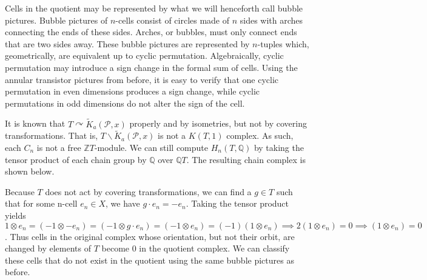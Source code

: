 \documentclass{amsart}
\newcommand{\bq}{\ensuremath{\mathbb{Q}}} %
\begin{document}
Cells in the quotient may be represented by what we will henceforth call bubble pictures. Bubble pictures of $n$-cells consist of circles made of $n$ sides with arches connecting the ends of these sides. Arches, or bubbles, must only connect ends that are two sides away. These bubble pictures are represented by $n$-tuples which, geometrically, are equivalent up to cyclic permutation. Algebraically, cyclic permutation may introduce a sign change in the formal sum of cells. Using the annular transistor pictures from before, it is easy to verify that one cyclic permutation in even dimensions produces a sign change, while cyclic permutations in odd dimensions do not alter the sign of the cell.

It is known that $T \curvearrowright \widetilde{K}_{a}(\mathcal{P}, x)$ properly and by isometries, but not by covering transformations. That is, $T\backslash \widetilde{K}_{a}(\mathcal{P}, x)$ is not a $K(T,1)$ complex. As such, each $C_{n}$ is not a free $\mathbb{Z}T$-module. We can still compute $H_{n}(T, \bq)$ by taking the tensor product of each chain group by $\bq$ over $\bq T$. The resulting chain complex is shown below.

\bigskip 															

\begin{center}
	
	
\end{center}

\bigskip

Because $T$ does not act by covering transformations, we can find a $g \in T$ such that for some n-cell $e_{n} \in X$, we have $g \cdot e_{n} = -e_{n}$. Taking the tensor product yields $1 \otimes e_{n} = (-1 \otimes -e_{n}) = (-1 \otimes g \cdot e_{n}) = (-1 \otimes e_{n}) = (-1)(1 \otimes e_{n}) \implies 2(1 \otimes e_{n}) = 0 \implies (1 \otimes e_{n}) = 0$. Thus cells in the original complex whose orientation, but not their orbit, are changed by elements of $T$ become $0$ in the quotient complex. We can classify these cells that do not exist in the quotient using the same bubble pictures as before.
\end{document}
